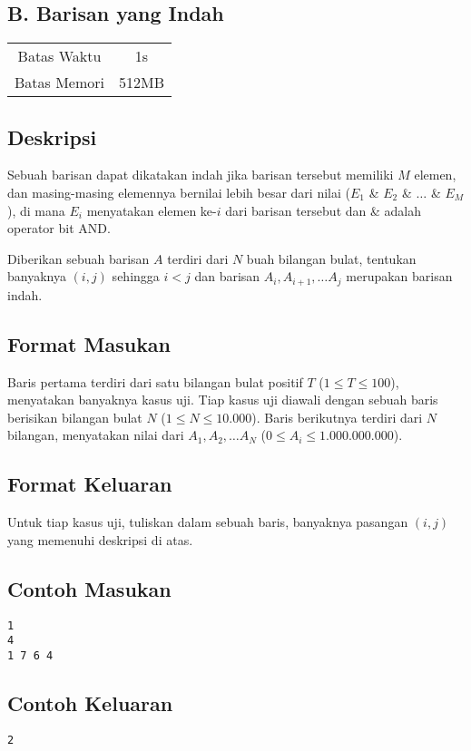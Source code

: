\documentclass{article}
\begin{document}
\begin{center}
    \section*{B. Barisan yang Indah}

    \begin{tabular}{ | c c | }
        \hline
        Batas Waktu  & 1s \\
        Batas Memori & 512MB \\
        \hline
    \end{tabular}
\end{center}

\subsection*{Deskripsi}
Sebuah barisan dapat dikatakan indah jika barisan tersebut memiliki $M$ elemen, dan masing-masing elemennya bernilai lebih besar dari nilai ($E_1$ \& $E_2$ \& $\dots$ \& $E_M$), di mana $E_i$ menyatakan elemen ke-$i$ dari barisan tersebut dan \& adalah operator bit AND.

Diberikan sebuah barisan $A$ terdiri dari $N$ buah bilangan bulat, tentukan banyaknya $(i, j)$ sehingga $i < j$ dan barisan $A_i, A_{i+1}, \dots A_j$ merupakan barisan indah.

\subsection*{Format Masukan}
Baris pertama terdiri dari satu bilangan bulat positif $T$ ($1 \leq T \leq 100$), menyatakan banyaknya kasus uji.
Tiap kasus uji diawali dengan sebuah baris berisikan bilangan bulat $N$ ($1 \leq N \leq 10.000$).
Baris berikutnya terdiri dari $N$ bilangan, menyatakan nilai dari $A_1, A_2, \dots A_N$ ($0 \leq A_i \leq 1.000.000.000$).

\subsection*{Format Keluaran}
Untuk tiap kasus uji, tuliskan dalam sebuah baris, banyaknya pasangan $(i, j)$ yang memenuhi deskripsi di atas.
\\

\begin{multicols}{2}
\subsection*{Contoh Masukan}
\begin{lstlisting}
1
4
1 7 6 4
\end{lstlisting}
\columnbreak
\subsection*{Contoh Keluaran}
\begin{lstlisting}
2
\end{lstlisting}
\vfill
\null
\end{multicols}
\end{document}

